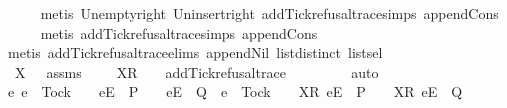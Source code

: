 \begin{isabellebody}
\ \ \ \ \isamarkupfalse%
\ {\isacharparenleft}metis\ Un{\isacharunderscore}empty{\isacharunderscore}right\ Un{\isacharunderscore}insert{\isacharunderscore}right\ add{\isacharunderscore}Tick{\isacharunderscore}refusal{\isacharunderscore}trace{\isachardot}simps{\isacharparenleft}{}{\isacharparenright}\ append{\isacharunderscore}Cons{\isacharparenright}\isanewline
\ \ \ \ \isamarkupfalse%
\ {\isacharparenleft}metis\ add{\isacharunderscore}Tick{\isacharunderscore}refusal{\isacharunderscore}trace{\isachardot}simps{\isacharparenleft}{}{\isacharparenright}\ append{\isacharunderscore}Cons{\isacharparenright}\isanewline
\ \ \ \ \isamarkupfalse%
\ {\isacharparenleft}metis\ add{\isacharunderscore}Tick{\isacharunderscore}refusal{\isacharunderscore}trace{\isachardot}elims\ append{\isacharunderscore}Nil\ list{\isachardot}distinct{\isacharparenleft}{}{\isacharparenright}\ list{\isachardot}sel{\isacharparenleft}{}{\isacharparenright}{\isacharparenright}\isanewline
\ \ \isamarkupfalse%
\ \isamarkupfalse%
\ {\isasymrho}{\isacharprime}{\isacharprime}\ X{\isacharprime}\ {\isasymsigma}{\isacharprime}\ \ {\isasymrho}{\isacharunderscore}assms{\isacharcolon}\ {\isachardoublequoteopen}{\isasymrho}\ {\isacharequal}\ {\isasymrho}{\isacharprime}{\isacharprime}\ {\isacharat}\ {\isacharbrackleft}X{\isacharprime}{\isacharbrackright}\isactrlsub R\ {\isacharhash}\ {\isasymsigma}{\isacharprime}\ {\isasymand}\ add{\isacharunderscore}Tick{\isacharunderscore}refusal{\isacharunderscore}trace\ {\isasymrho}{\isacharprime}{\isacharprime}\ {\isacharequal}\ {\isasymrho}{\isacharprime}{\isachardoublequoteclose}\isanewline
\ \ \ \ \isamarkupfalse%
\ auto\isanewline
\ \ \isamarkupfalse%
\ \isamarkupfalse%
\ {\isachardoublequoteopen}{\isacharbraceleft}e{\isachardot}\ e\ {\isasymnoteq}\ Tock\ {\isasymand}\ {\isasymrho}{\isacharprime}{\isacharprime}\ {\isacharat}\ {\isacharbrackleft}{\isacharbrackleft}e{\isacharbrackright}\isactrlsub E{\isacharbrackright}\ {\isasymin}\ P\ {\isasymand}\ {\isasymrho}{\isacharprime}{\isacharprime}\ {\isacharat}\ {\isacharbrackleft}{\isacharbrackleft}e{\isacharbrackright}\isactrlsub E{\isacharbrackright}\ {\isasymin}\ Q\ {\isasymor}\ e\ {\isacharequal}\ Tock\ {\isasymand}\ {\isasymrho}{\isacharprime}{\isacharprime}\ {\isacharat}\ {\isacharbrackleft}{\isacharbrackleft}X{\isacharprime}{\isacharbrackright}\isactrlsub R{\isacharcomma}\ {\isacharbrackleft}e{\isacharbrackright}\isactrlsub E{\isacharbrackright}\ {\isasymin}\ P\ {\isasymand}\ {\isasymrho}{\isacharprime}{\isacharprime}\ {\isacharat}\ {\isacharbrackleft}{\isacharbrackleft}X{\isacharprime}{\isacharbrackright}\isactrlsub R{\isacharcomma}\ {\isacharbrackleft}e{\isacharbrackright}\isactrlsub E{\isacharbrackright}\ {\isasymin}\ Q{\isacharbraceright}\isanewline

\end{isabellebody}
